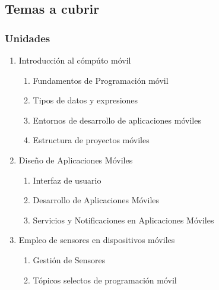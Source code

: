 \begin{frame}
\section{Temas a cubrir}
\frametitle{Unidades }
\begin{enumerate}

\item Introducción al cómpúto móvil
\begin{enumerate}
\item Fundamentos de Programación móvil
\item Tipos de datos y expresiones
\item Entornos de desarrollo de aplicaciones móviles
\item Estructura de proyectos móviles
\end{enumerate}

\item Diseño de Aplicaciones Móviles
\begin{enumerate}
\item Interfaz de usuario
\item Desarrollo de Aplicaciones Móviles
\item Servicios y Notificaciones en Aplicaciones Móviles
\end{enumerate}

\item Empleo de sensores en dispositivos móviles
\begin{enumerate}
\item Gestión de Sensores
\item Tópicos selectos de programación móvil
\end{enumerate}

\end{enumerate}

\end{frame}
